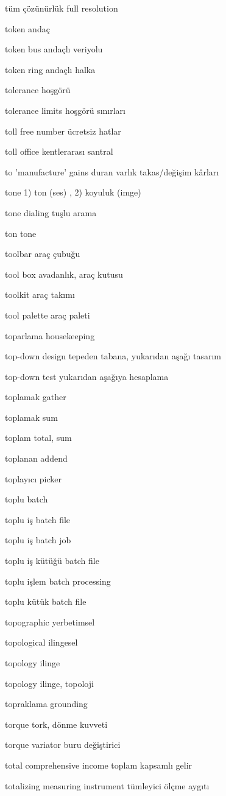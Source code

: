\documentclass[12pt,fleqn]{article}\usepackage{../../common}
\begin{document}
tüm çözünürlük full resolution

token andaç

token bus andaçlı veriyolu

token ring andaçlı halka

tolerance hoşgörü

tolerance limits hoşgörü sınırları

toll free number ücretsiz hatlar

toll office kentlerarası santral

to 'manufacture' gains duran varlık takas/değişim kârları

tone 1) ton (ses) , 2) koyuluk (imge)

tone dialing tuşlu arama

ton tone

toolbar araç çubuğu

tool box avadanlık, araç kutusu

toolkit araç takımı

tool palette araç paleti

toparlama housekeeping

top-down design tepeden tabana, yukarıdan aşağı tasarım

top-down test yukarıdan aşağıya hesaplama

toplamak gather

toplamak sum

toplam total, sum

toplanan addend

toplayıcı picker

toplu batch

toplu iş batch file

toplu iş batch job

toplu iş kütüğü batch file

toplu işlem batch processing

toplu kütük batch file

topographic yerbetimsel

topological ilingesel

topology ilinge

topology ilinge, topoloji

topraklama grounding

torque tork, dönme kuvveti

torque variator buru değiştirici

total comprehensive income toplam kapsamlı gelir

totalizing measuring instrument tümleyici ölçme aygıtı
\end{document}
